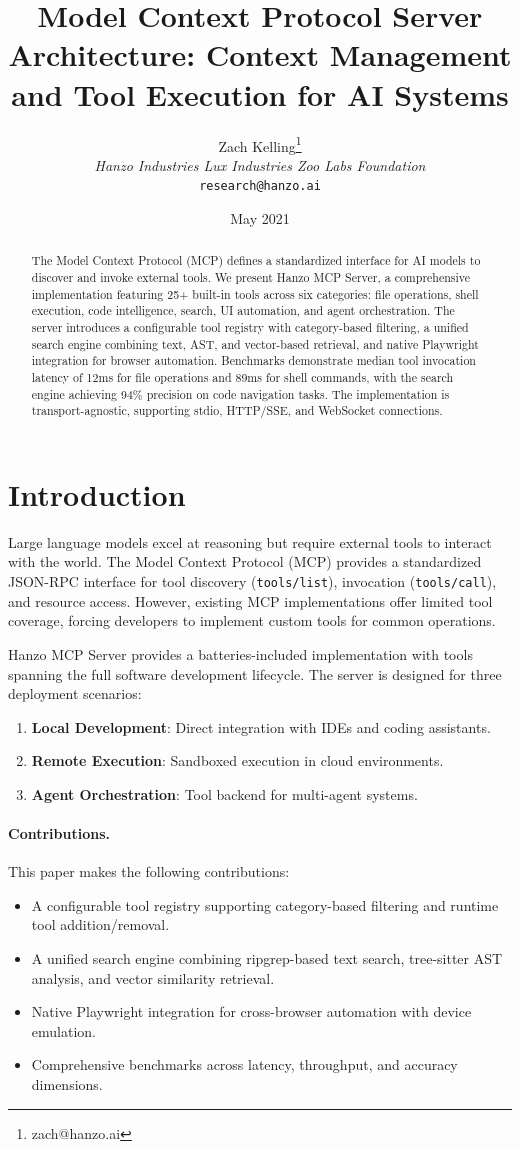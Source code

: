 \documentclass[11pt,twocolumn]{article}
\title{Model Context Protocol Server Architecture: Context Management and Tool Execution for AI Systems}
\author{Zach Kelling\thanks{zach@hanzo.ai} \\ \textit{Hanzo Industries \quad Lux Industries \quad Zoo Labs Foundation} \\ \texttt{research@hanzo.ai}}
\date{May 2021}
\begin{document}
\luxcoverpage

\begin{abstract}
The Model Context Protocol (MCP) defines a standardized interface for AI models to discover and invoke external tools. We present Hanzo MCP Server, a comprehensive implementation featuring 25+ built-in tools across six categories: file operations, shell execution, code intelligence, search, UI automation, and agent orchestration. The server introduces a configurable tool registry with category-based filtering, a unified search engine combining text, AST, and vector-based retrieval, and native Playwright integration for browser automation. Benchmarks demonstrate median tool invocation latency of 12ms for file operations and 89ms for shell commands, with the search engine achieving 94\% precision on code navigation tasks. The implementation is transport-agnostic, supporting stdio, HTTP/SSE, and WebSocket connections.
\end{abstract}

\section{Introduction}

Large language models excel at reasoning but require external tools to interact with the world. The Model Context Protocol (MCP) provides a standardized JSON-RPC interface for tool discovery (\texttt{tools/list}), invocation (\texttt{tools/call}), and resource access. However, existing MCP implementations offer limited tool coverage, forcing developers to implement custom tools for common operations.

Hanzo MCP Server provides a batteries-included implementation with tools spanning the full software development lifecycle. The server is designed for three deployment scenarios:
\begin{enumerate}
    \item \textbf{Local Development}: Direct integration with IDEs and coding assistants.
    \item \textbf{Remote Execution}: Sandboxed execution in cloud environments.
    \item \textbf{Agent Orchestration}: Tool backend for multi-agent systems.
\end{enumerate}

\paragraph{Contributions.} This paper makes the following contributions:
\begin{itemize}
    \item A configurable tool registry supporting category-based filtering and runtime tool addition/removal.
    \item A unified search engine combining ripgrep-based text search, tree-sitter AST analysis, and vector similarity retrieval.
    \item Native Playwright integration for cross-browser automation with device emulation.
    \item Comprehensive benchmarks across latency, throughput, and accuracy dimensions.
\end{itemize}
\end{document}
